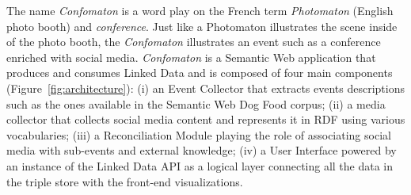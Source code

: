 \begin{table}[htbp]
\end{table}

The name \emph{Confomaton} is a word play on the French term \emph{Photomaton} (English photo booth) and \emph{conference}. Just like a Photomaton illustrates the scene inside of the photo booth, the \emph{Confomaton} illustrates an event such as a conference enriched with social media. \emph{Confomaton} is a Semantic Web application that produces and consumes Linked Data and is composed of four main components (Figure~\ref{fig:architecture}): (i) an Event Collector that extracts events descriptions such as the ones available in the Semantic Web Dog Food corpus; (ii) a media collector that collects social media content and represents it in RDF using various vocabularies; (iii) a Reconciliation Module playing the role of associating social media with sub-events and external knowledge; (iv) a User Interface powered by an instance of the Linked Data API as a logical layer connecting all the data in the triple store with the front-end visualizations.


